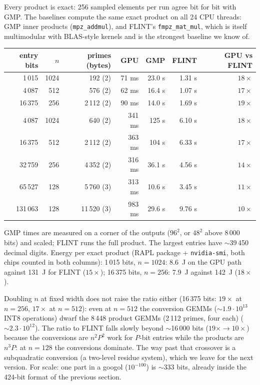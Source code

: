 \documentclass[11pt]{article}
\begin{document}
Every product is exact: 256 sampled elements per run agree bit for bit with GMP. The baselines compute the same exact product
on all 24 CPU threads: GMP inner products (\texttt{mpz\_addmul}), and FLINT's \texttt{fmpz\_mat\_mul}, which is itself
multimodular with BLAS-style kernels and is the strongest baseline we know of.
\begin{center}\begin{tabular}{rrrrrrr}\toprule
entry bits & $n$ & primes (bytes) & GPU & GMP & FLINT & GPU vs FLINT \\\midrule
1\,015 & 1024 & 192 (2) & 71 ms & 23.0 s & 1.31 s & $18\times$ \\
4\,087 & 512 & 576 (2) & 62 ms & 16.4 s & 1.07 s & $17\times$ \\
16\,375 & 256 & 2\,112 (2) & 90 ms & 14.0 s & 1.69 s & $19\times$ \\
4\,087 & 1024 & 640 (2) & 341 ms & 125 s & 6.10 s & $18\times$ \\
16\,375 & 512 & 2\,112 (2) & 363 ms & 104 s & 6.33 s & $17\times$ \\
32\,759 & 256 & 4\,352 (2) & 316 ms & 36.1 s & 4.56 s & $14\times$ \\
65\,527 & 128 & 5\,760 (3) & 313 ms & 10.6 s & 3.45 s & $11\times$ \\
131\,063 & 128 & 11\,520 (3) & 983 ms & 29.6 s & 9.76 s & $10\times$ \\\bottomrule
\end{tabular}\end{center}
GMP times are measured on a corner of the outputs ($96^2$, or $48^2$ above 8\,000 bits) and scaled; FLINT runs the full
product. The largest entries have $\sim$39\,450 decimal digits. Energy per exact product (RAPL package + \texttt{nvidia-smi},
both chips counted in both columns): 1\,015 bits, $n=1024$: 8.6~J on the GPU path against 131~J for FLINT ($15\times$);
16\,375 bits, $n=256$: 7.9~J against 142~J ($18\times$).

Doubling $n$ at fixed width does not raise the ratio either (16\,375 bits: $19\times$ at $n=256$, $17\times$ at $n=512$): even at $n=512$ the conversion GEMMs ($\sim 1.9\cdot10^{13}$ INT8 operations) dwarf the 8\,448 product GEMMs (2\,112 primes, four each) ($\sim 2.3\cdot10^{12}$). The ratio to FLINT falls slowly beyond $\sim$16\,000 bits ($19\times\to10\times$) because the conversions are $n^2P^2$ work
for $P$-bit entries while the products are $n^3P$: at $n=128$ the conversions dominate. The way past that crossover is a
subquadratic conversion (a two-level residue system), which we leave for the next version. For scale: one part in a googol
($10^{-100}$) is $\sim$333 bits, already inside the 424-bit format of the previous section.
\end{document}
